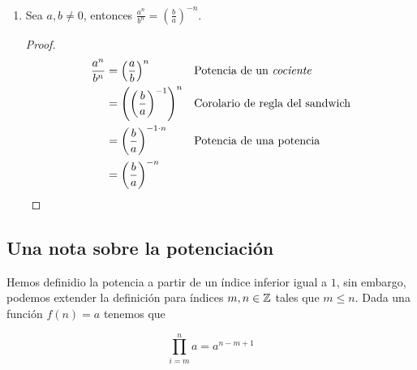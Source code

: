 \begin{enumerate}[label=\alph*)]
  \item Sea $a,b\neq 0$, entonces $\frac{a^n}{b^n} = \left(\frac{b}{a}\right)^{-n}$.
  \begin{proof}\leavevmode
    \begin{align*}
      \frac{a^n}{b^n} &= \left(\frac{a}{b}\right)^n && \text{Potencia de un \textit{cociente}}\\
      &= \left(\left(\frac{b}{a}\right)^{-1}\right)^n && \text{Corolario de regla del sandwich}\\
      &= \left(\frac{b}{a}\right)^{-1\cdot n} && \text{Potencia de una potencia}\\
      &= \left(\frac{b}{a}\right)^{-n}
    \end{align*}
  \end{proof}
  
\end{enumerate}

\clearpage

\pagebreak

\subsection*{Una nota sobre la potenciación}

Hemos definidio la potencia a partir de un índice inferior igual a $1$, sin embargo, podemos extender la definición para índices $m, n\in \mathbb{Z}$ tales que $m\leq n$. Dada una función $f(n)=a$ tenemos que

\[\prod_{i=m}^{n} a = a^{n-m+1}\]

